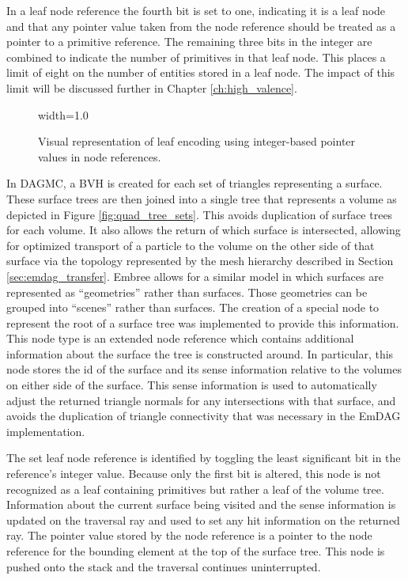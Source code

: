 
In a leaf node reference the fourth bit is set to one, indicating it is a leaf
node and that any pointer value taken from the node reference should be treated
as a pointer to a primitive reference. The remaining three bits in the integer are
combined to indicate the number of primitives in that leaf node. This places a
limit of eight on the number of entities stored in a leaf node. The impact of
this limit will be discussed further in Chapter \ref{ch:high_valence}.

\begin{figure}[H]
  \centering
  {width=1.0\textwidth}
  \caption{Visual representation of leaf encoding using integer-based
    pointer values in node references.}
  \label{fig:leaf_encoding}
\end{figure}

In DAGMC, a BVH is created for each set of triangles representing a
surface. These surface trees are then joined into a single tree that represents
a volume as depicted in Figure \ref{fig:quad_tree_sets}. This avoids duplication
of surface trees for each volume. It also allows the return of which surface is
intersected, allowing for optimized transport of a particle to the volume on the
other side of that surface via the topology represented by the mesh hierarchy
described in Section \ref{sec:emdag_transfer}. Embree allows for a similar model
in which surfaces are represented as ``geometries'' rather than surfaces. Those
geometries can be grouped into ``scenes'' rather than surfaces.  The creation of
a special node to represent the root of a surface tree was implemented to
provide this information. This node type is an extended node reference which
contains additional information about the surface the tree is constructed
around. In particular, this node stores the id of the surface and its sense
information relative to the volumes on either side of the surface. This sense
information is used to automatically adjust the returned triangle normals for
any intersections with that surface, and avoids the duplication of triangle
connectivity that was necessary in the EmDAG implementation.

The set leaf node reference is identified by toggling the least significant bit in
the reference's integer value. Because only the first bit is altered, this node
is not recognized as a leaf containing primitives but rather a leaf of the
volume tree. Information about the current surface being visited and the sense
information is updated on the traversal ray and used to set any hit information
on the returned ray. The pointer value stored by the node reference is a pointer
to the node reference for the bounding element at the top of the
surface tree. This node is pushed onto the stack and the traversal continues
uninterrupted.

